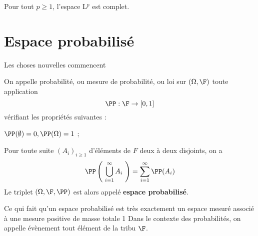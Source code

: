 \ep

\ep

\bp
Pour tout $p \geq 1$, l'espace L$^p$ est complet.
\ep


\section{Espace probabilisé}

Les choses nouvelles commencent 

\bigskip

On appelle probabilité, ou mesure de probabilité, ou loi sur $(\Omega, \F)$ toute application $$ \PP : \F \to [0,1]$$ vérifiant les propriétés suivantes : 
\ben
    \item $\PP(\emptyset) = 0, \PP(\Omega) = 1$ ;
    \item Pour toute suite $(A_i)_{i\geq 1}$ d'éléments de $F$ deux à deux disjoints, on a $$\PP \left( ~ \bigcup\limits_{i=1}^{\infty} A_i ~ \right) = \sum_{i=1}^{\infty} \PP(A_i)$$
\een
Le triplet $(\Omega, \F, \PP)$ est alors appelé \textbf{espace probabilisé}.

\bn 
Ce qui fait qu'un espace probabilisé est très exactement un espace mesuré associé à une mesure positive de masse totale 1 
\en
\bn
Dans le contexte des probabilités, on appelle évènement tout élément de la tribu $\F$.
\en
    
    
    
    
    
    
    
    
    
    
    
    
    
    

